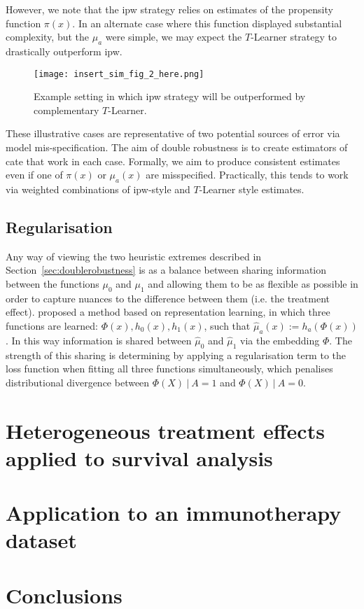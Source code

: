 \documentclass[../thesis.tex]{subfiles}
\begin{document}
However, we note that the \gls{ipw} strategy relies on estimates of the propensity function $\pi(x)$. In an alternate case where this function displayed substantial complexity, but the $\mu_a$ were simple, we may expect the $T$-Learner strategy to drastically outperform \gls{ipw}. 

\begin{figure}[!tpb] 
\centering
\texttt{[image: insert\_sim\_fig\_2\_here.png]}
\caption{Example setting in which \gls{ipw} strategy will be outperformed by complementary $T$-Learner.  \label{fig:insert_sim_fig_2_here}}
\end{figure}

These illustrative cases are representative of two potential sources of error via model mis-specification. The aim of double robustness is to create estimators of \gls{cate} that work in each case. Formally, we aim to produce consistent estimates even if one of $\pi(x)$ or $\mu_a(x)$ are misspecified. Practically, this tends to work via weighted combinations of \gls{ipw}-style and $T$-Learner style estimates. 


\subsection{Regularisation}
Any way of viewing the two heuristic extremes described in Section~\ref{sec:doublerobustness} is as a balance between sharing information between the functions $\mu_0$ and $\mu_1$ and allowing them to be as flexible as possible in order to capture nuances to the difference between them (i.e. the treatment effect). \citet{shalit_estimating_2017} proposed a method based on representation learning, in which three functions are learned: $\Phi(x), h_0(x), h_1(x)$, such that $\hat{\mu}_a(x) := h_a(\Phi(x))$. In this way information is shared between $\hat{\mu}_0$ and $\hat{\mu}_1$ via the embedding $\Phi$. The strength of this sharing is determining by applying a regularisation term to the loss function when fitting all three functions simultaneously, which penalises distributional divergence between $\Phi(X) \ | \ A = 1$ and $\Phi(X)  \ | \ A = 0$. 

\section{Heterogeneous treatment effects applied to survival analysis}

\section{Application to an immunotherapy dataset}
\section{Conclusions}
\dobib %
\end{document}
